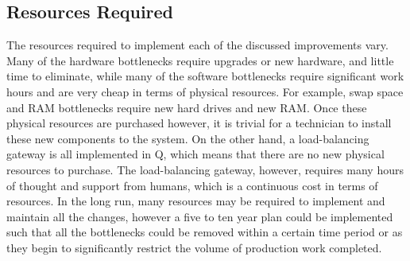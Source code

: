 \subsection{Resources Required} %
\label{sub:resources_required}
The resources required to implement each of the discussed improvements vary.  Many of the hardware bottlenecks require upgrades or new hardware, and little time to eliminate, while many of the software bottlenecks require significant work hours and are very cheap in terms of physical resources.  For example, swap space and RAM bottlenecks require new hard drives and new RAM.  Once these physical resources are purchased however, it is trivial for a technician to install these new components to the system.  On the other hand, a load-balancing gateway is all implemented in Q, which means that there are no new physical resources to purchase.  The load-balancing gateway, however, requires many hours of thought and support from humans, which is a continuous cost in terms of resources.  In the long run, many resources may be required to implement and maintain all the changes, however a five to ten year plan could be implemented such that all the bottlenecks could be removed within a certain time period or as they begin to significantly restrict the volume of production work completed.\\

